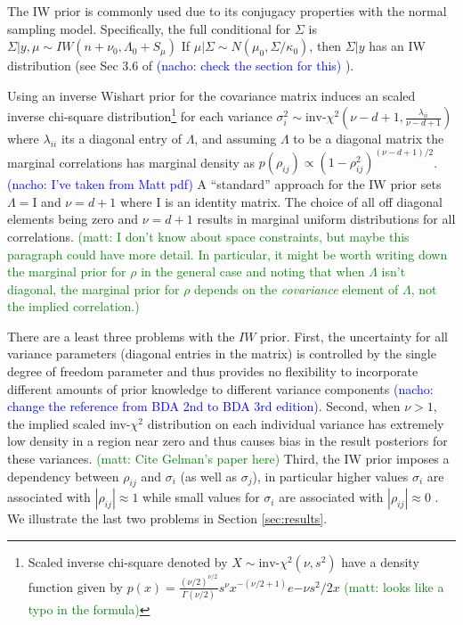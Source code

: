 \documentclass[a4paper]{article}
\newcommand{\nacho}[1]{\textcolor{blue}{(nacho: #1)}}
\newcommand{\matt}[1]{\textcolor{green}{(matt: #1)}}
\newcommand{\I}{\mathrm{I}}
\begin{document}
The IW prior is commonly used due to its conjugacy properties with the normal sampling model. Specifically, the full conditional for $\Sigma$ is $\Sigma \vert y,\mu \sim IW(n+\nu_0, \Lambda_0+S_\mu)$ If $\mu|\Sigma \sim N(\mu_0,\Sigma/\kappa_0)$, then $\Sigma|y$ has an IW distribution (see Sec 3.6 of \cite{bda2013} \nacho{check the section for this} ). 

Using an inverse Wishart prior for the covariance matrix induces an scaled inverse chi-square distribution\footnote{Scaled inverse chi-square denoted by $X \sim \mbox{inv-}\chi^2(\nu, s^2)$ have a density function given by $p(x) =  \frac{(\nu/2)^{\nu/2}} {\Gamma(\nu/2)} s^{\nu}x^{-(\nu/2 + 1)} e{-\nu s^2 / 2x} $ \matt{looks like a typo in the formula}} for each variance $\sigma_i^2\sim \mbox{inv-}\chi^2(\nu - d + 1, \frac{\lambda_{ii}}{\nu-d+1} )$ where $\lambda_{ii}$ its a diagonal entry of $\Lambda$, and assuming $\Lambda$ to be a diagonal matrix the marginal correlations has marginal density as $p(\rho_{ij}) \propto (1 - \rho_{ij}^2)^{(\nu - d + 1)/2}$. \nacho{I've taken from Matt pdf} A ``standard'' approach for the IW prior sets $\Lambda=\I$ and $\nu=d+1$ where $\I$ is an identity matrix. The choice of all off diagonal elements being zero and $\nu=d+1$ results in marginal uniform distributions for all correlations. \matt{I don't know about space constraints, but maybe this paragraph could have more detail. In particular, it might be worth writing down the marginal prior for $\rho$ in the general case and noting that when $\Lambda$ isn't diagonal, the marginal prior for $\rho$ depends on the {\it covariance} element of $\Lambda$, not the implied correlation.}

There are a least three problems with the $IW$ prior. First, the uncertainty for all variance parameters (diagonal entries in the matrix) is controlled by the single degree of freedom parameter and thus provides no flexibility to incorporate different amounts of prior knowledge to different variance components \citep{bda2013} \nacho{change the reference from BDA 2nd to BDA 3rd edition}. Second, when $\nu>1$, the implied scaled inv-$\chi^2$ distribution on each individual variance has extremely low density in a region near zero and thus causes bias in the result posteriors for these variances. \matt{Cite Gelman's paper here} Third, the IW prior imposes a dependency between $\rho_{ij}$ and $\sigma_i$ (as well as $\sigma_j$), in particular higher values $\sigma_i$ are associated with $|\rho_{ij}|\approx 1$ while small values for $\sigma_i$ are associated with $|\rho_{ij}|\approx 0$ \citep{visualize}.  We illustrate the last two problems in Section \ref{sec:results}.
\end{document}
